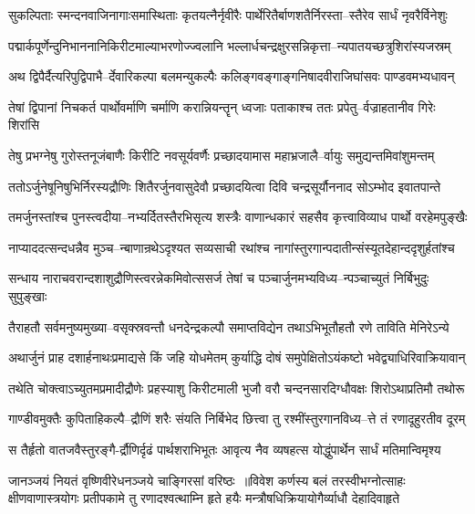 \twolineshloka
{सुकल्पिताः स्मन्दनवाजिनागाःसमास्थिताः कृतयत्नैर्नृवीरैः}
{पार्थेरितैर्बाणशतैर्निरस्ता--स्तैरेव सार्धं नृवरैर्विनेशुः}


\twolineshloka
{पद्मार्कपूर्णेन्दुनिभाननानिकिरीटमाल्याभरणोज्ज्वलानि}
{भल्लार्धचन्द्रक्षुरसन्निकृत्ता--न्यपातयच्छत्रुशिरांस्यजस्रम्}


\twolineshloka
{अथ द्विपैर्दैत्यरिपुद्विपाभै--र्देवारिकल्पा बलमन्युकल्पैः}
{कलिङ्गवङ्गाङ्गनिषादवीराजिघांसवः पाण्डवमभ्यधावन्}


\twolineshloka
{तेषां द्विपानां निचकर्त पार्थोवर्माणि चर्माणि करान्नियन्तॄन्}
{ध्वजाः पताकाश्च ततः प्रपेतु--र्वज्राहतानीव गिरेः शिरांसि}


\twolineshloka
{तेषु प्रभग्नेषु गुरोस्तनूजंबाणैः किरीटि नवसूर्यवर्णैः}
{प्रच्छादयामास महाभ्रजालै--र्वायुः समुद्यन्तमिवांशुमन्तम्}


\twolineshloka
{ततोऽर्जुनेषूनिषुभिर्निरस्यद्रौणिः शितैरर्जुनवासुदेवौ}
{प्रच्छादयित्वा दिवि चन्द्रसूर्यौननाद सोऽम्भोद इवातपान्ते}


\twolineshloka
{तमर्जुनस्तांश्च पुनस्त्वदीया--नभ्यर्दितस्तैरभिसृत्य शस्त्रैः}
{वाणान्धकारं सहसैव कृत्त्वाविव्याध पार्थो वरहेमपुङ्खैः}


\twolineshloka
{नाप्याददत्सन्दधन्नैव मुञ्च--न्बाणान्रथेऽदृश्यत सव्यसाची}
{रथांश्च नागांस्तुरगान्पदातीन्संस्यूतदेहान्ददृशुर्हतांश्च}


\twolineshloka
{सन्धाय नाराचवरान्दशाशुद्रौणिस्त्वरन्नेकमिवोत्ससर्ज}
{तेषां च पञ्चार्जुनमभ्यविध्य--न्पञ्चाच्युतं निर्बिभुदुः सुपुङ्खाः}


\twolineshloka
{तैराहतौ सर्वमनुष्यमुख्या--वसृक्स्रवन्तौ धनदेन्द्रकल्पौ}
{समाप्तविद्येन तथाऽभिभूतौहतौ रणे ताविति मेनिरेऽन्ये}


\twolineshloka
{अथार्जुनं प्राह दशार्हनाथःप्रमाद्यसे किं जहि योधमेतम्}
{कुर्याद्धि दोषं समुपेक्षितोऽयंकष्टो भवेद्व्याधिरिवाक्रियावान्}


\twolineshloka
{तथेति चोक्त्वाऽच्युतमप्रमादीद्रौणेः प्रहस्याशु किरीटमाली}
{भुजौ वरौ चन्दनसारदिग्धौवक्षः शिरोऽथाप्रतिमौ तथोरू}


\twolineshloka
{गाण्डीवमुक्तैः कुपिताहिकल्पै--द्रौणिं शरैः संयति निर्बिभेद}
{छित्त्वा तु रश्मींस्तुरगानविध्य--त्ते तं रणादूहुरतीव दूरम्}


\threelineshloka
{स तैर्हृतो वातजवैस्तुरङ्गै-र्द्रौणिर्दृढं पार्थशराभिभूतः}
{आवृत्य नैव व्यषहत्स योद्धुंपार्थेन सार्धं मतिमान्विमृश्य}
{}


जानञ्जयं नियतं वृष्णिवीरेधनञ्जये चाङ्गिरसां वरिष्ठः ॥विवेश कर्णस्य बलं तरस्वीभग्नोत्साहः क्षीणवाणास्त्रयोगः
\twolineshloka
{प्रतीपकामे तु रणादश्वत्थाम्नि हृते हयैः}
{मन्त्रौषधिक्रियायोगैर्व्याधौ देहादिवाहृते}


